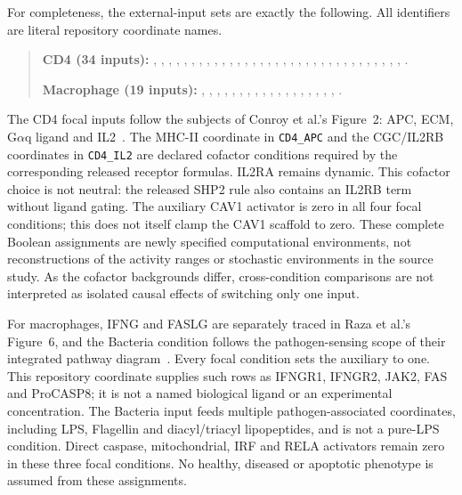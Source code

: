 For completeness, the external-input sets are exactly the following.
All identifiers are literal repository coordinate names.
\begin{quote}\small
\textbf{CD4 (34 inputs):}
, , , ,
, , , ,
, , , ,
, , , ,
, , , ,
, , , ,
, , , ,
, , , ,
, .

\textbf{Macrophage (19 inputs):}
, , ,
, , ,
, , , ,
, , ,
, ,
, , , .
\end{quote}



The CD4 focal inputs follow the subjects of Conroy et al.'s
Figure~2: APC, ECM, G$\alpha$q ligand and IL2~\cite{Conroy2014}.
The MHC-II coordinate in \texttt{CD4\_APC} and the CGC/IL2RB coordinates
in \texttt{CD4\_IL2} are declared cofactor conditions required by the
corresponding released receptor formulas. IL2RA remains dynamic. This
cofactor choice is not neutral: the released SHP2 rule also contains an
IL2RB term without ligand gating. The auxiliary CAV1 activator is zero
in all four focal conditions; this does not itself clamp the CAV1
scaffold to zero. These complete Boolean assignments are newly specified
computational environments, not reconstructions of the activity ranges
or stochastic environments in the source study. As the cofactor
backgrounds differ, cross-condition comparisons are not interpreted as
isolated causal effects of switching only one input.

For macrophages, IFNG and FASLG are separately traced in Raza et al.'s
Figure~6, and the Bacteria condition follows the pathogen-sensing scope
of their integrated pathway diagram~\cite{Raza2008}. Every focal condition
sets the auxiliary  to one. This repository
coordinate supplies such rows as IFNGR1, IFNGR2, JAK2, FAS and ProCASP8;
it is not a named biological ligand or an experimental concentration.
The Bacteria input feeds multiple pathogen-associated coordinates,
including LPS, Flagellin and diacyl/triacyl lipopeptides, and is not a
pure-LPS condition. Direct caspase, mitochondrial, IRF and RELA activators
remain zero in these three focal conditions. No healthy, diseased or
apoptotic phenotype is assumed from these assignments.


